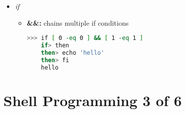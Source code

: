 \documentclass[12pt]{article}
\begin{document}
\begin{itemize}
\begin{itemize}
    \end{itemize}

    \item \textit{if}

    \begin{itemize}
    \item \textbf{\&\&:} chains multiple if conditions

    \begin{lstlisting}[language=bash]
    >>> if [ 0 -eq 0 ] && [ 1 -eq 1 ]
    if> then
    then> echo 'hello'
    then> fi
    hello
    \end{lstlisting}
    \end{itemize}

\end{itemize}

\bigskip

\section*{Shell Programming 3 of 6}

\bigskip
\end{document}
